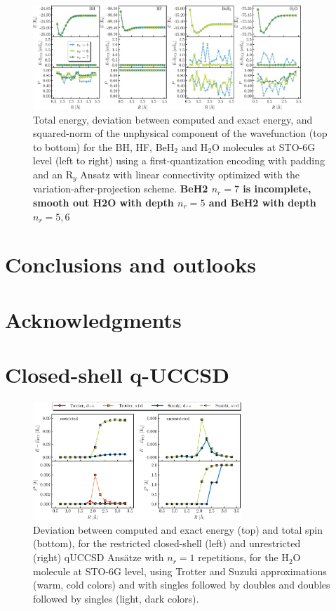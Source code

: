 \documentclass[aps,pra,onecolumn]{revtex4-2}
\newcommand{\todo}[1]{{\bf{{\color{red}#1}}}}
\begin{document}
\begin{figure}[t!]
\includegraphics[width=0.9\textwidth]{../figures/first_quantization_pad_vap_ry_linear/first_quantization_pad_vap_ry_linear.eps}
\caption{Total energy, deviation between computed and exact energy, and squared-norm of the unphysical component of the wavefunction
(top to bottom) for the BH, HF, BeH$_2$ and H$_2$O molecules at STO-6G level (left to right) 
using a first-quantization encoding with padding and an R$_y$ Ansatz with linear connectivity optimized with the variation-after-projection scheme.
\todo{BeH2 $n_r=7$ is incomplete, smooth out H2O with depth $n_r=5$ and BeH2 with depth $n_r=5,6$}
}
\label{figure:first_pad_vap_ry}
\end{figure} 

\section{Conclusions and outlooks}
\label{sec:conclusions}

\section*{Acknowledgments}


\appendix

\section{Closed-shell q-UCCSD}
\label{sec:cc_trotter}

\begin{figure}[t!]
\includegraphics[width=0.7\textwidth]{../figures/qUCCSD_flavors/quccsd_reps_1.eps}
\caption{Deviation between computed and exact energy (top) and total spin (bottom), for the restricted closed-shell (left) and unrestricted (right) qUCCSD Ans\"{a}tze with $n_r=1$ repetitions, for the H$_2$O molecule at STO-6G level, using Trotter and Suzuki approximations (warm, cold colors) and with singles followed by doubles and doubles followed by singles (light, dark colors).}
\label{figure:quccsd_reps_1}
\end{figure} 
\end{document}

